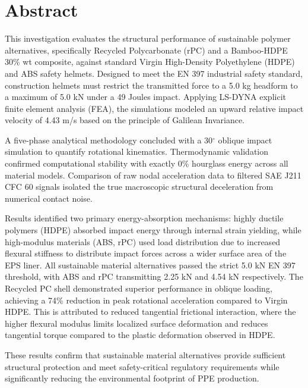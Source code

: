 \chapter*{Abstract}

\begingroup
{}
\rmfamily\fontsize{11}{11}\itshape\selectfont
\setlength{\parskip}{6pt}

This investigation evaluates the structural performance of sustainable polymer 
al\-tern\-at\-ives, specifically Recycled Poly\-car\-bon\-ate (rPC) and a 
Bamboo-HDPE 30\% wt composite, against standard Virgin High-Density 
Polyethylene (HDPE) and ABS safety helmets. Designed to meet the EN 397 industrial 
safety standard, construction helmets must restrict the transmitted force 
to a 5.0 kg headform to a maximum of 5.0 kN under a 49 Joules impact. 
Applying LS-DYNA explicit finite element analysis (FEA), the simulations 
modeled an upward relative impact velocity of 4.43 m/s based on the 
principle of Galilean Invariance.

A five-phase analytical methodology concluded with a 30$^\circ$ 
oblique impact simulation to quantify rotational kinematics. 
Thermodynamic validation confirmed computational stability with 
exactly 0\% hourglass energy across all material models. Comparison of 
raw nodal acceleration data to filtered SAE J211 CFC 60 signals isolated the 
true macroscopic structural deceleration from numerical contact noise.

Results identified two primary energy-absorption mechanisms: highly ductile 
polymers (HDPE) absorbed impact energy through internal strain yielding, 
while high-modulus materials (ABS, rPC) used load distribution due to 
increased flexural stiffness to distribute impact forces across a wider surface area of the 
EPS liner. All sustainable material alternatives passed the strict 5.0 kN EN 397 threshold, with ABS and rPC transmitting 2.25 kN and 4.54 kN respectively. The Recycled PC shell demonstrated superior 
performance in oblique loading, achieving a 74\% reduction in peak 
rotational acceleration compared to Virgin HDPE. This is attributed to 
reduced tangential frictional interaction, where the higher flexural modulus 
limits localized surface deformation and reduces tangential torque compared 
to the plastic deformation observed in HDPE.

These results confirm that sustainable material alternatives provide 
sufficient structural protection and meet safety-critical regulatory requirements while 
significantly reducing the environmental footprint of PPE production.\par
\endgroup

\vspace{12pt}

